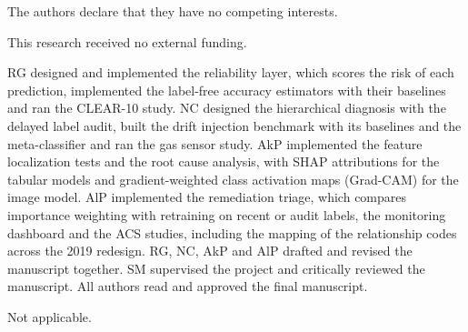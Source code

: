 \documentclass[pdflatex,referee,lineno,sn-basic]{sn-jnl}
\begin{document}

The authors declare that they have no competing interests.


This research received no external funding.


RG designed and implemented the reliability layer, which scores the risk of each prediction, implemented the label-free accuracy estimators with their baselines and ran the CLEAR-10 study. NC designed the hierarchical diagnosis with the delayed label audit, built the drift injection benchmark with its baselines and the meta-classifier and ran the gas sensor study. AkP implemented the feature localization tests and the root cause analysis, with SHAP attributions for the tabular models and gradient-weighted class activation maps (Grad-CAM) for the image model. AlP implemented the remediation triage, which compares importance weighting with retraining on recent or audit labels, the monitoring dashboard and the ACS studies, including the mapping of the relationship codes across the 2019 redesign. RG, NC, AkP and AlP drafted and revised the manuscript together. SM supervised the project and critically reviewed the manuscript. All authors read and approved the final manuscript.


Not applicable.


\end{document}
